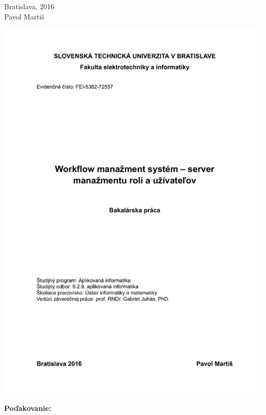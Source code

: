 \documentclass[12pt, oneside]{book}
\def\mfrok{2016}
\def\mfautor{Pavol Martiš}
\def\mfmiesto{Bratislava, \mfrok}
\begin{document}
\noindent \mfmiesto\\
\mfautor

\eject %





\newpage 
\thispagestyle{empty}
\hspace{-2cm}\includegraphics[width=1.1\textwidth]{images/zadanie}


\frontmatter

\setcounter{page}{3}
\newpage 
\begin{center}
	\bf Poďakovanie: \\
\end{center}
\end{document}
